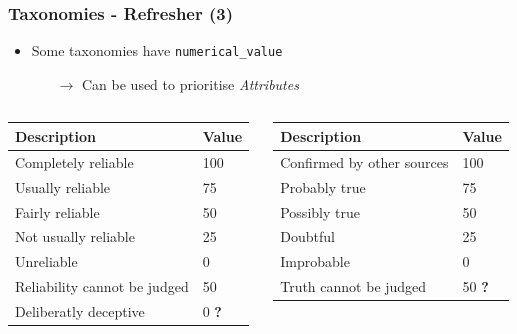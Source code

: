 \begin{frame}
    \frametitle{Taxonomies - Refresher (3)}
    \begin{itemize}
        \item Some taxonomies have \texttt{numerical\_value}
        \begin{itemize}
            \item[$\rightarrow$] Can be used to prioritise \textit{Attributes}
        \end{itemize}
    \end{itemize}
    \vspace{1cm}

    \begin{footnotesize}
    \begin{columns}[T] %
    \begin{column}{.40\textwidth}
        \begin{tabular}{|ll|}
            \hline
            \textbf{Description} & \textbf{Value}\\
            \hline
            Completely reliable & 100\\
            Usually reliable & 75\\
            Fairly reliable & 50\\
            Not usually reliable & 25\\
            Unreliable & 0\\
            Reliability cannot be judged & 50\\
            Deliberatly deceptive & 0 \textbf{\color{red}?}\\
            \hline
        \end{tabular}
    \end{column}%
    \hfill%
    \begin{column}{.48\textwidth}
        \begin{tabular}{|ll|}
            \hline
            \textbf{Description} & \textbf{Value}\\
            \hline
            Confirmed by other sources & 100\\
            Probably true & 75\\
            Possibly true & 50\\
            Doubtful & 25\\
            Improbable & 0\\
            Truth cannot be judged & 50 \textbf{\color{red}?}\\
            \hline
        \end{tabular}
    \end{column}%
    \end{columns}
    \end{footnotesize}
\end{frame}

